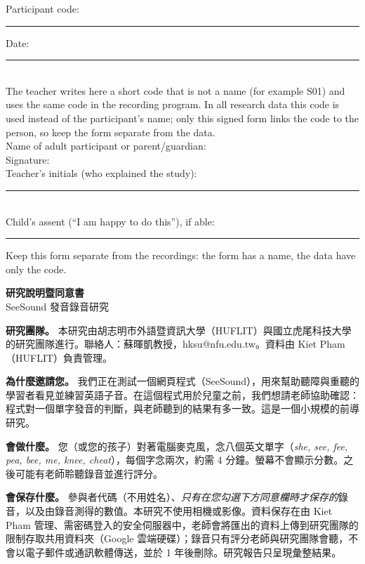 \documentclass[11pt,a4paper]{article}
\begin{document}
\vspace{6pt}
\newcommand{\line}[2]{\noindent #1 \hrulefill\hspace{1em}#2 \rule{4cm}{0.4pt}\\[12pt]}
\noindent Participant code: \rule{3.5cm}{0.4pt}\hfill Date: \rule{4cm}{0.4pt}\\[2pt]
{\footnotesize\noindent The teacher writes here a short code that is not a name (for example S01) and uses the same code in the recording program. In all research data this code is used instead of the participant's name; only this signed form links the code to the person, so keep the form separate from the data.}\\[12pt]
\noindent Name of adult participant or parent/guardian: \hrulefill\\[12pt]
\noindent Signature: \hrulefill\\[12pt]
\noindent Teacher's initials (who explained the study): \rule{3cm}{0.4pt}\\[12pt]
\noindent Child's assent (``I am happy to do this''), if able: \rule{4cm}{0.4pt}

\vspace{4pt}\footnotesize Keep this form separate from the recordings: the form has a name, the data have only the code.

\newpage
\begin{center}{\Large\bfseries 研究說明暨同意書}\\[2pt]
SeeSound 發音錄音研究\end{center}

\textbf{研究團隊。} 本研究由胡志明市外語暨資訊大學（HUFLIT）與國立虎尾科技大學的研究團隊進行。聯絡人：蘇暉凱教授，hksu@nfu.edu.tw。資料由 Kiet Pham（HUFLIT）負責管理。

\textbf{為什麼邀請您。} 我們正在測試一個網頁程式（SeeSound），用來幫助聽障與重聽的學習者看見並練習英語子音。在這個程式用於兒童之前，我們想請老師協助確認：程式對一個單字發音的判斷，與老師聽到的結果有多一致。這是一個小規模的前導研究。

\textbf{會做什麼。} 您（或您的孩子）對著電腦麥克風，念八個英文單字（\textit{she, see, fee, pea, bee, me, knee, cheat}），每個字念兩次，約需 4 分鐘。螢幕不會顯示分數。之後可能有老師聆聽錄音並進行評分。

\textbf{會保存什麼。} 參與者代碼（不用姓名）、\textit{只有在您勾選下方同意欄時才保存的}錄音，以及由錄音測得的數值。本研究不使用相機或影像。資料保存在由 Kiet Pham 管理、需密碼登入的安全伺服器中，老師會將匯出的資料上傳到研究團隊的限制存取共用資料夾（Google 雲端硬碟）；錄音只有評分老師與研究團隊會聽，不會以電子郵件或通訊軟體傳送，並於 1 年後刪除。研究報告只呈現彙整結果。
\end{document}
